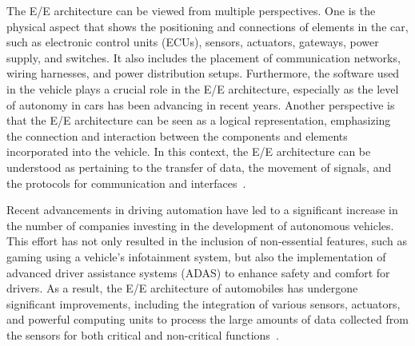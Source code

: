     The E/E architecture can be viewed from multiple perspectives. One is the physical aspect that shows the positioning and connections of elements in the car, such as electronic control units (ECUs), sensors, actuators, gateways, power supply, and switches. It also includes the placement of communication networks, wiring harnesses, and power distribution setups. Furthermore, the software used in the vehicle plays a crucial role in the E/E architecture, especially as the level of autonomy in cars has been advancing in recent years.
    Another perspective is that the E/E architecture can be seen as a logical representation, emphasizing the connection and interaction between the components and elements incorporated into the vehicle. In this context, the E/E architecture can be understood as pertaining to the transfer of data, the movement of signals, and the protocols for communication and interfaces~\cite{askaripoor2022architecture}.
    
    Recent advancements in driving automation have led to a significant increase in the number of companies investing in the development of autonomous vehicles. This effort has not only resulted in the inclusion of non-essential features, such as gaming using a vehicle's infotainment system, but also the implementation of advanced driver assistance systems (ADAS) to enhance safety and comfort for drivers. As a result, the E/E architecture of automobiles has undergone significant improvements, including the integration of various sensors, actuators, and powerful computing units to process the large amounts of data collected from the sensors for both critical and non-critical functions~\cite{askaripoor2022architecture}.
    

